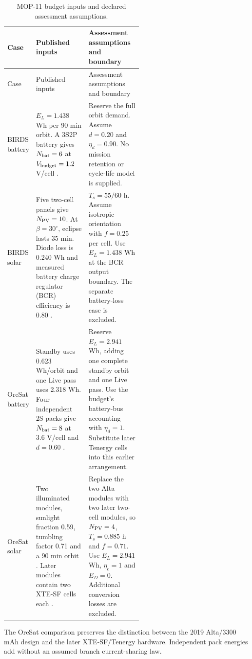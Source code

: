 \begingroup\footnotesize\setlength{\tabcolsep}{3pt}\setlength{\parskip}{0pt}
\begin{longtable}{@{}P{0.16\linewidth}P{0.39\linewidth}P{\tabcolsep\relax}@{}}
\caption{MOP-11 budget inputs and declared assessment assumptions.}\label{tab:cots-case-inputs}\\
\toprule
Case & Published inputs & Assessment assumptions and boundary \\ \midrule
\endfirsthead
\toprule
Case & Published inputs & Assessment assumptions and boundary \\ \midrule
\endhead
\bottomrule\endfoot
BIRDS battery & $E_L=1.438$ Wh per 90 min orbit. A 3S2P battery gives $N_{\rm bat}=6$ at $V_{\rm budget}=1.2$ V/cell \citep[pp.~5, 9]{shrestha2022birds4powerbudget}. & Reserve the full orbit demand. Assume $d=0.20$ and $\eta_d=0.90$. No mission retention or cycle-life model is supplied. \\
BIRDS solar & Five two-cell panels give $N_{\rm PV}=10$. At $\beta=30^\circ$, eclipse lasts 35 min. Diode loss is 0.240 Wh and measured battery charge regulator (BCR) efficiency is 0.80 \citep[pp.~4, 8]{shrestha2022birds4powerbudget}. & $T_s=55/60$ h. Assume isotropic orientation with $f=0.25$ per cell. Use $E_L=1.438$ Wh at the BCR output boundary. The separate battery-loss case is excluded. \\
OreSat battery & Standby uses 0.623 Wh/orbit and one Live pass uses 2.318 Wh. Four independent 2S packs give $N_{\rm bat}=8$ at 3.6 V/cell and $d=0.60$ \citep[p.~1]{oresat2019powerbudget}. & Reserve $E_L=2.941$ Wh, adding one complete standby orbit and one Live pass. Use the budget's battery-bus accounting with $\eta_d=1$. Substitute later Tenergy cells into this earlier arrangement. \\
OreSat solar & Two illuminated modules, sunlight fraction 0.59, tumbling factor 0.71 and a 90 min orbit \citep[p.~1]{oresat2019powerbudget}. Later modules contain two XTE-SF cells each \citep[p.~5]{greenberg2021oresat}. & Replace the two Alta modules with two later two-cell modules, so $N_{\rm PV}=4$, $T_s=0.885$ h and $f=0.71$. Use $E_L=2.941$ Wh, $\eta_c=1$ and $E_D=0$. Additional conversion losses are excluded. \\
\end{longtable}\endgroup

The OreSat comparison preserves the distinction between the 2019 Alta/3300 mAh design and the later XTE-SF/Tenergy hardware.
Independent pack energies add without an assumed branch current-sharing law.

